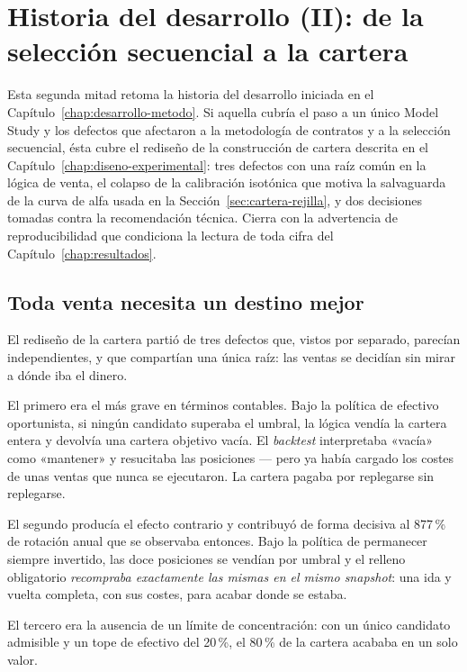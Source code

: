 \chapter{Historia del desarrollo (II): de la selección secuencial a la cartera}
\label{chap:desarrollo-cartera}

Esta segunda mitad retoma la historia del desarrollo iniciada en el
Capítulo~\ref{chap:desarrollo-metodo}. Si aquella cubría el paso a un único Model Study y los
defectos que afectaron a la metodología de contratos y a la selección secuencial, ésta cubre el
rediseño de la construcción de cartera descrita en el Capítulo~\ref{chap:diseno-experimental}: tres
defectos con una raíz común en la lógica de venta, el colapso de la calibración isotónica que
motiva la salvaguarda de la curva de alfa usada en la Sección~\ref{sec:cartera-rejilla}, y dos
decisiones tomadas contra la recomendación técnica. Cierra con la advertencia de reproducibilidad
que condiciona la lectura de toda cifra del Capítulo~\ref{chap:resultados}.

\section{Toda venta necesita un destino mejor}

El rediseño de la cartera partió de tres defectos que, vistos por separado, parecían independientes,
y que compartían una única raíz: las ventas se decidían sin mirar a dónde iba el dinero.

El primero era el más grave en términos contables. Bajo la política de efectivo oportunista, si
ningún candidato superaba el umbral, la lógica vendía la cartera entera y devolvía una cartera
objetivo vacía. El \textit{backtest} interpretaba «vacía» como «mantener» y resucitaba las
posiciones --- pero ya había cargado los costes de unas ventas que nunca se ejecutaron. La cartera
pagaba por replegarse sin replegarse.

El segundo producía el efecto contrario y contribuyó de forma decisiva al 877\,\% de rotación anual
que se observaba entonces. Bajo la política de permanecer siempre invertido, las doce posiciones se
vendían por umbral y el relleno obligatorio \emph{recompraba exactamente las mismas en el mismo
snapshot}: una ida y vuelta completa, con sus costes, para acabar donde se estaba.

El tercero era la ausencia de un límite de concentración: con un único candidato admisible y un tope
de efectivo del 20\,\%, el 80\,\% de la cartera acababa en un solo valor.

